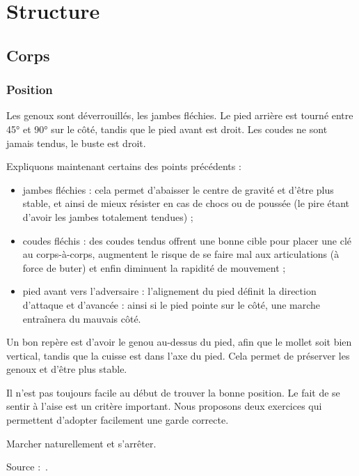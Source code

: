 \chapter{Structure}


\section{Corps}


\subsection{Position}


Les genoux sont déverrouillés, les jambes fléchies.
Le pied arrière est tourné entre 45° et 90° sur le côté, tandis que le pied avant est droit.
Les coudes ne sont jamais tendus, le buste est droit.

Expliquons maintenant certains des points précédents :
\begin{itemize}
	\item jambes fléchies : cela permet d'abaisser le centre de gravité et d'être plus stable, et ainsi de mieux résister en cas de chocs ou de poussée (le pire étant d'avoir les jambes totalement tendues) ;
	\item coudes fléchis : des coudes tendus offrent une bonne cible pour placer une clé au corps-à-corps, augmentent le risque de se faire mal aux articulations (à force de buter) et enfin diminuent la rapidité de mouvement ;
	\item pied avant vers l'adversaire : l'alignement du pied définit la direction d'attaque et d'avancée : ainsi si le pied pointe sur le côté, une marche entraînera du mauvais côté.
\end{itemize}

Un bon repère est d'avoir le genou au-dessus du pied, afin que le mollet soit bien vertical, tandis que la cuisse est dans l'axe du pied.
Cela permet de préserver les genoux et d'être plus stable.

Il n'est pas toujours facile au début de trouver la bonne position.
Le fait de se sentir à l'aise est un critère important.
Nous proposons deux exercices qui permettent d'adopter facilement une garde correcte.

\begin{exercice}

Marcher naturellement et s'arrêter.

Source :~\cite{guidoux:dijon:thibault:2015}.

\end{exercice}


